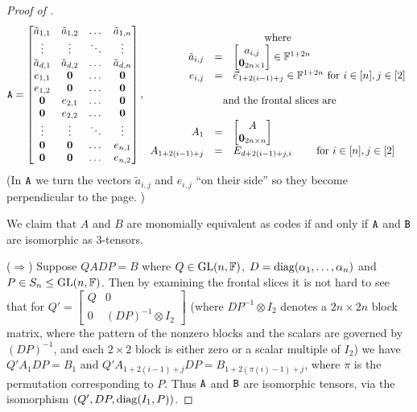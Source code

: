 \begin{proof}[Proof of ]
$$
\tA=\begin{bmatrix}
\tilde a_{1,1} & \tilde a_{1,2} & \dots & \tilde a_{1,n} \\
\vdots & \vdots & \ddots & \vdots \\
\tilde a_{d,1} & \tilde a_{d,2} & \dots & \tilde a_{d,n}\\
e_{1,1} & \vzero & \dots & \vzero \\
e_{1,2} & \vzero & \dots & \vzero \\
\vzero & e_{2,1} & \dots & \vzero \\
\vzero & e_{2,2} & \dots & \vzero \\
\vdots & \vdots & \ddots & \vdots \\
\vzero & \vzero & \dots & e_{n,1} \\
\vzero & \vzero & \dots & e_{n,2}
\end{bmatrix}, 
\begin{array}{rcl}
\multicolumn{3}{c}{\text{where}} \\
\tilde a_{i,j} & = & \begin{bmatrix} a_{i,j} \\ \vzero_{2n \times 1} \end{bmatrix} \in \F^{1 + 2n} \\
e_{i,j} & =& \vec{e}_{1+2(i-1)+j} \in \F^{1+2n} \text{ for } i\in[n], j\in[2] \\ \\
\multicolumn{3}{c}{\text{ and the frontal slices are}} \\ \\
A_1 & = & \begin{bmatrix} A \\ \vzero_{2n \times n} \end{bmatrix} \\
A_{1 + 2(i-1) + j} & = & E_{d + 2(i-1) + j, i} \qquad \text{ for } i\in[n], j\in[2]
\end{array}
$$
(In $\mathtt{A}$ we turn the vectors $\tilde a_{i,j}$ and $e_{i,j}$ ``on their side'' so they become perpendicular to the page. )

We claim that $A$ and $B$ are monomially equivalent as codes if and only if $\mathtt{A}$ 
and $\mathtt{B}$ are isomorphic as 3-tensors.

($\Rightarrow$) Suppose $QADP = B$ where $Q \in \mathrm{GL}(n,\mathbb{F})$, $D = \operatorname{diag}(\alpha_1, \dotsc, \alpha_n)$ and $P \in S_n \leq \mathrm{GL}(n,\mathbb{F})$. Then by examining the frontal slices it is not hard to see that for $Q' = \begin{bmatrix} Q & 0 \\ 0 & (DP)^{-1} \otimes I_2 \end{bmatrix}$ (where $DP^{-1} \otimes I_2$ denotes a $2n \times 2n$ block matrix, where the pattern of the nonzero blocks and the scalars are governed by $(DP)^{-1}$, and each $2 \times 2$ block is either zero or a scalar multiple of $I_2$) we have $Q' A_1 DP = B_1$ and $Q' A_{1 + 2(i-1) + j} DP = B_{1 + 2(\pi(i)-1) + j}$, where $\pi$ is the permutation corresponding to $P$. Thus $\mathtt{A}$ and $\mathtt{B}$ are isomorphic tensors, via the isomorphism $(Q', DP, \operatorname{diag}(I_1, P))$.


\end{proof}
